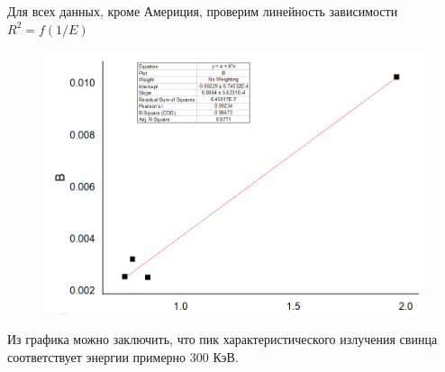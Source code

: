 \documentclass[%
 reprint,
 amsmath,amssymb,
 aps,
]{revtex4-2}
\begin{document}
Для всех данных, кроме Америция, проверим линейность зависимости $R^2 = f(1/E)$

\begin{figure}[h!]
	\includegraphics[scale=0.5]{5.png}
\end{figure}
 Из графика можно заключить, что пик характеристического излучения свинца соответствует энергии примерно $300$ КэВ.
\end{document}
